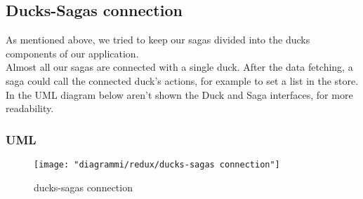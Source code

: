 \documentclass[../redux]{subfiles}
\begin{document}
	\subsection{Ducks-Sagas connection}
	As mentioned above, we tried to keep our sagas divided into the ducks components of our application.\\
	Almost all our sagas are connected with a single duck. After the data fetching, a saga could call the connected duck's actions, for example to set a list in the store.
	In the UML diagram below aren't shown the Duck and Saga interfaces, for more readability.
	\subsubsection{UML}
	\begin{figure}[H]
		\centering
		\texttt{[image: "diagrammi/redux/ducks-sagas connection"]}
		\caption{ducks-sagas connection}
		\label{fig:Ducks-sagas connection}
	\end{figure}
\end{document}

